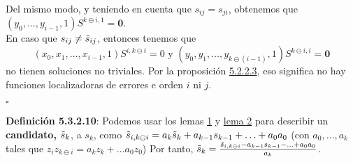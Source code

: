\documentclass[11pt,spanish]{book}
\newcommand{\qed}{\begin{flushright} $\square$ \end{flushright}}
\begin{document}
 Del mismo modo, y teniendo en cuenta que $s_{ij}=s_{ji}$, obtenemos que $(y_0,\ldots,y_{i-1},1)S^{k\ominus i, 1}=\mathbf{0}$. \\
 
 En caso que $s_{ij}\neq \Tilde{s}_{ij}$, entonces tenemos que
 $$(x_0,x_1,\ldots, x_{i-1},1)S^{i,k\ominus i}=0 \text{ y } (y_0,y_1,\ldots,y_{k\ominus (i-1)},1)S^{k\ominus i, i}=\mathbf{0}$$ no tienen soluciones no triviales. Por la proposición \hyperlink{prop5.2.2.3}{5.2.2.3}, eso significa no hay funciones localizadoras de errores e orden $i$ ni $j$.
 \qed
\textbf{Definición 5.3.2.10}: Podemos usar los lemas \hyperlink{lema5.1}{1} y \hyperlink{lema5.2}{lema 2} para describir un \textbf{candidato, $\Tilde{s}_{k}$}, a $s_{k}$, como $\Tilde{s}_{i,k\ominus i}=a_k\tilde{s}_k +a_{k-1}s_{k-1}+\ldots+a_0a_0$ (con $a_0,\ldots,a_k$ tales que $z_i z_{k\ominus i}=a_k z_k+\ldots a_0 z_0$) Por tanto, $\Tilde{s}_{k}=\frac{\Tilde{s}_{i,k\ominus i}-a_{k-1}s_{k-1}-\ldots+a_0a_0}{a_k}$.\\
\end{document}
